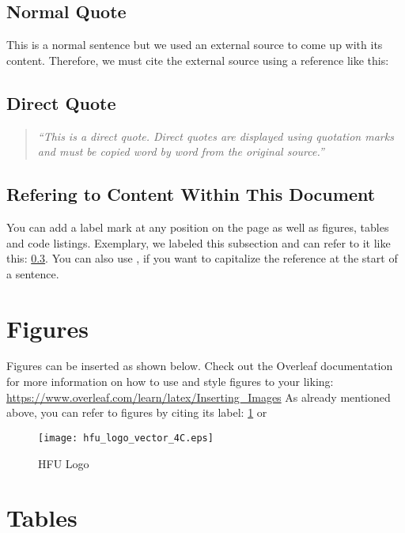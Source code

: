 \subsection{Normal Quote}
This is a normal sentence but we used an external source to come up with its content. Therefore, we must cite the external source using a reference like this: \cite{taylor1994integrated}

\subsection{Direct Quote}
\begin{quote}
    \textit{\enquote{This is a direct quote. Direct quotes are displayed using quotation marks and must be copied word by word from the original source.}} \cite{taylor1994integrated}
\end{quote}

\subsection{Refering to Content Within This Document}
\label{example_label}
You can add a label mark at any position on the page as well as figures, tables and code listings. Exemplary, we labeled this subsection and can refer to it like this:  \cref{example_label}. You can also use , if you want to capitalize the reference at the start of a sentence.


\section{Figures}

Figures can be inserted as shown below. Check out the Overleaf documentation for more information on how to use and style figures to your liking: \url{https://www.overleaf.com/learn/latex/Inserting_Images} As already mentioned above, you can refer to figures by citing its label: \cref{pic:hfu_logo} or 
\begin{figure}[ht]  %
    \centering      %
    \texttt{[image: hfu\_logo\_vector\_4C.eps]}
    \caption{HFU Logo}      %
    \label{pic:hfu_logo}    %
\end{figure}


\section{Tables}

